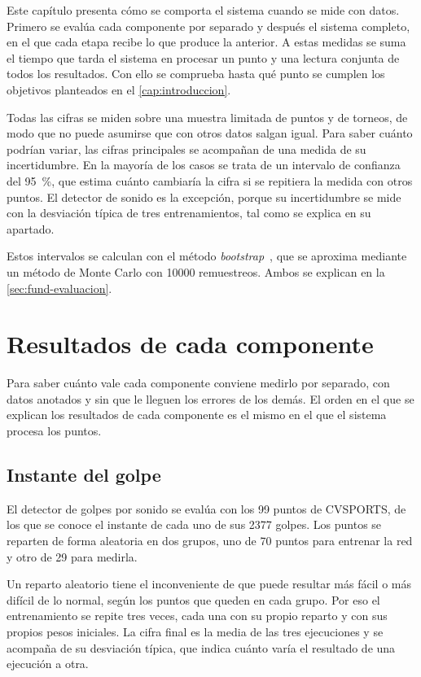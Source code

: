 
Este capítulo presenta cómo se comporta el sistema cuando se mide con datos.
Primero se evalúa cada componente por separado y después el sistema completo, en el que cada etapa recibe lo que produce la anterior.
A estas medidas se suma el tiempo que tarda el sistema en procesar un punto y una lectura conjunta de todos los resultados.
Con ello se comprueba hasta qué punto se cumplen los objetivos planteados en el \cref{cap:introduccion}.

Todas las cifras se miden sobre una muestra limitada de puntos y de torneos, de modo que no puede asumirse que con otros datos salgan igual.
Para saber cuánto podrían variar, las cifras principales se acompañan de una medida de su incertidumbre.
En la mayoría de los casos se trata de un intervalo de confianza del 95~\%, que estima cuánto cambiaría la cifra si se repitiera la medida con otros puntos.
El detector de sonido es la excepción, porque su incertidumbre se mide con la desviación típica de tres entrenamientos, tal como se explica en su apartado.

Estos intervalos se calculan con el método \textit{bootstrap}~\cite{efron1979bootstrap}, que se aproxima mediante un método de Monte Carlo con \num{10000} remuestreos.
Ambos se explican en la \cref{sec:fund-evaluacion}.

\section{Resultados de cada componente}
\label{sec:resultados-componentes}

Para saber cuánto vale cada componente conviene medirlo por separado, con datos anotados y sin que le lleguen los errores de los demás.
El orden en el que se explican los resultados de cada componente es el mismo en el que el sistema procesa los puntos.

\subsection{Instante del golpe}
\label{sec:resultados-instante}

El detector de golpes por sonido se evalúa con los 99 puntos de CVSPORTS, de los que se conoce el instante de cada uno de sus 2377 golpes.
Los puntos se reparten de forma aleatoria en dos grupos, uno de 70 puntos para entrenar la red y otro de 29 para medirla.

Un reparto aleatorio tiene el inconveniente de que puede resultar más fácil o más difícil de lo normal, según los puntos que queden en cada grupo.
Por eso el entrenamiento se repite tres veces, cada una con su propio reparto y con sus propios pesos iniciales.
La cifra final es la media de las tres ejecuciones y se acompaña de su desviación típica, que indica cuánto varía el resultado de una ejecución a otra.

